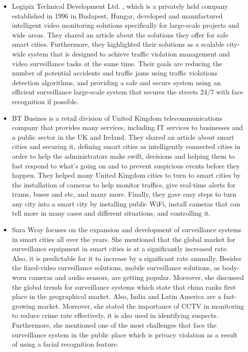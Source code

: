 \documentclass[12pt]{article}
\begin{document}
\begin{itemize}
\item Logipix Technical Development Ltd. \cite{logipix}, which is a privately held company established in 1996 in Budapest, Hungar, developed and manufactured intelligent video monitoring solutions specifically for large-scale projects and wide areas. They shared an article about the solutions they offer for safe smart cities. Furthermore, they highlighted their solutions as a scalable city-wide system that is designed to achieve traffic violation management and video surveillance tasks at the same time. Their goals are reducing the number of potential accidents and traffic jams using traffic violations detection algorithms, and providing a safe and secure system using an efficient surveillance large-scale system that secures the streets 24/7 with face recognition if possible.
\newpage
\item BT Busines \cite{BT} is a retail division of United Kingdom telecommunications company that provides many services, including IT services to businesses and a public sector in the UK and Ireland. They shared an article about smart cities and securing it, defining smart cities as intelligently connected cities in order to help the administrators make swift, decisions and helping them to fast respond to what’s going on and to prevent suspicious events before they happen. They helped many United Kingdom cities to turn to smart cities by the installation of cameras to help monitor traffics, give real-time alerts for trams, buses and etc, and many more. Finally, they gave easy steps to turn any city into a smart city by installing public WiFi, install cameras that can tell more in many cases and different situations, and controlling it.
\item Sara Wray \cite{Sara2020} focuses on the expansion and development of surveillance systems in smart cities all over the years. She mentioned that the global market for surveillance equipment in smart cities is at a significantly increased rate. Also, it is predictable for it to increase by a significant rate annually. Besides the fixed-video surveillance solutions, mobile surveillance solutions, as body-worn cameras and audio sensors, are getting popular. Moreover, she discussed the global trends for surveillance systems which state that china ranks first place in the geographical market. Also, India and Latin America are a fast-growing market. Moreover, she stated the importance of CCTV in monitoring to reduce crime rate effectively, it is also used in identifying suspects. Furthermore, she mentioned one of the most challenges that face the surveillance system in the public place which is privacy violation as a result of using a facial recognition feature.


\end{itemize}
\end{document}
